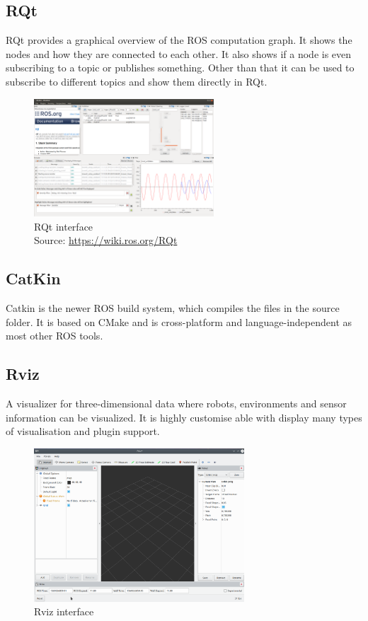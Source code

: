 \subsection{RQt}
RQt provides a graphical overview of the ROS computation graph. It shows the nodes and how they are connected to each other. It also shows if a node is even subscribing to a topic or publishes something. Other than that it can be used to subscribe to different topics and show them directly in RQt.
\begin{figure}[h]
	\centering
	\includegraphics[width=0.6\textwidth]{./media/images/RQt}
  	\caption{RQt interface\\Source: \url{https://wiki.ros.org/RQt}}
  	\label{rqtinterface}
\end{figure}

\subsection{CatKin}
Catkin is the newer ROS build system, which compiles the files in the source folder. It is based on CMake and is cross-platform and language-independent as most other ROS tools.

\subsection{Rviz}
A visualizer for three-dimensional data where robots, environments and sensor information can be visualized. It is highly customise able with display many types of visualisation and plugin support. \newline
\begin{figure}[h]
	\centering
	\includegraphics[width=0.7\textwidth]{./media/images/rviz}
  	\caption{Rviz interface}
  	\label{rvizinterface}
\end{figure}

